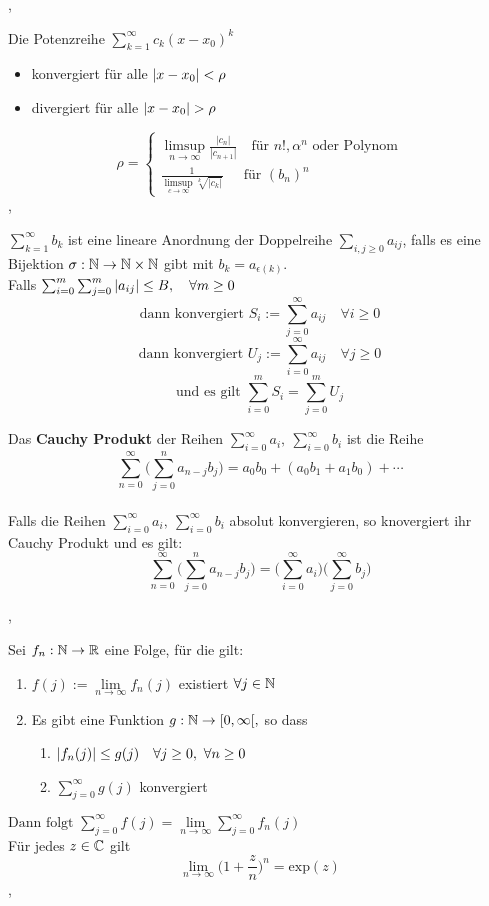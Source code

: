 \sep

\Korollar[2.7.21] Die Potenzreihe $\sum_{k=1}^{\infty} c_{k} (x-x_0)^k$
\begin{itemize}
\item konvergiert für alle $\left\lvert x - x_0 \right\rvert < \rho$ 
\item divergiert für alle $\left\lvert x - x_0 \right\rvert > \rho$
\end{itemize}
\[\rho = \begin{cases}
\limsup\limits_{n \rightarrow \infty} \frac{\left|c_{n}\right|}{\left|c_{n + 1}\right|} \quad \text{für } n!, \alpha^n \text{ oder Polynom} \\
\frac{1}{\limsup\limits_{c \rightarrow \infty} \sqrt[k]{\left|c_{k}\right|}}  \quad \  \ \text{für } (b_n)^n
\end{cases}\]
\sep

\Def[2.7.22] $\sum_{k=1}^{\infty} b_{k}$ ist eine lineare Anordnung der Doppelreihe $\sum_{i,j \geq 0} a_{ij}$, falls es eine Bijektion $\sigma : \mathbb{N} \rightarrow \mathbb{N} \times \mathbb{N}$ gibt mit $b_k = a_{\epsilon(k)}$.  \\

\Satz[2.7.23] Falls $\sum_{i=0}^{m}\sum_{j=0}^{m}\left\lvert a_{ij} \right\rvert \leq B, \quad \forall m \geq 0$
\[ \text{dann konvergiert } S_{i} := \sum_{j=0}^{\infty} a_{ij} \quad \forall i \geq 0 \]
\[ \text{dann konvergiert } U_{j} := \sum_{i=0}^{\infty} a_{ij} \quad \forall j \geq 0 \]
\[ \text{und es gilt } \sum_{i=0}^{m} S_{i} = \sum_{j=0}^{m} U_{j} \] 

\Satz[2.7.24] Das \textbf{Cauchy Produkt} der Reihen $\sum_{i=0}^{\infty} a_i, \ \sum_{i=0}^{\infty} b_i$ ist die Reihe
\[\sum_{n=0}^\infty \Bigg(\sum_{j=0}^{n} a_{n-j} b_{j} \Bigg) = a_0 b_0 + (a_0 b_1 + a_1 b_0) + \cdots  \]  \\

\Satz[2.7.26] Falls die Reihen $\sum_{i=0}^{\infty} a_i, \ \sum_{i=0}^{\infty} b_i$ absolut konvergieren, so knovergiert ihr Cauchy Produkt und es gilt:
\[\sum_{n=0}^\infty \Bigg(\sum_{j=0}^{n} a_{n-j} b_{j} \Bigg) = \Bigg( \sum_{i=0}^\infty a_i \Bigg) \Bigg(\sum_{j=0}^\infty b_j \Bigg) \]

\sep

\Satz[2.7.28] Sei $f_n : \mathbb{N} \rightarrow \mathbb{R}$ eine Folge, für die gilt:
\begin{enumerate}
\item[(1)] $ f(j) :=  \lim\limits_{n \rightarrow \infty} f_n(j) $ existiert $\forall j \in \mathbb{N}$ 
\item[(2)] Es gibt eine Funktion $g : \mathbb{N} \rightarrow [0, \infty[,$ so dass
\begin{enumerate}
\item[(2.1)] $\left\lvert f_n(j) \right\rvert \leq g(j) \quad \forall j \geq 0, \ \forall n \geq 0$
\item[(2.2)] $\sum_{j=0}^{\infty} g(j)$ konvergiert
\end{enumerate}
\end{enumerate}

\( \text{Dann folgt } \sum_{j=0}^{\infty} f(j) =  \lim\limits_{n \rightarrow \infty} \sum_{j=0}^{\infty} f_n(j) \)  \\

\Korollar[2.7.29] Für jedes $z \in \mathbb{C}$ gilt
\[\lim\limits_{n \rightarrow \infty} \bigg(1 + \frac{z}{n} \bigg)^n = \text{exp}(z) \]
\sep